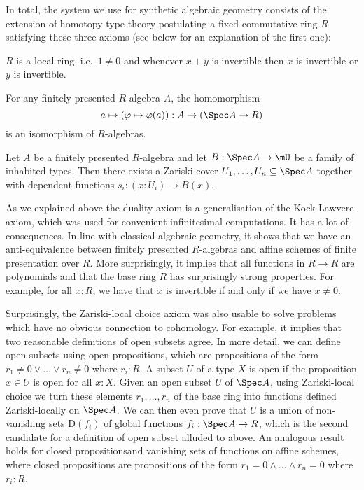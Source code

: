 In total, the system we use for synthetic algebraic geometry consists of the extension of homotopy type theory postulating a fixed commutative ring $R$ satisfying these three axioms (see below for an explanation of the first one):

\begin{center}
\begin{axiom}[Locality]%
  \label{loc-axiom}
  $R$ is a local ring, i.e.\ $1\neq 0$ and whenever $x+y$ is invertible then $x$ is invertible or $y$ is invertible.
\end{axiom}

\begin{axiom}[Duality]%
  \label{duality-axiom}
  For any finitely presented $R$-algebra $A$, the homomorphism
  \[ a \mapsto (\varphi\mapsto \varphi(a)) : A \to (\Spec A \to R)\]
  is an isomorphism of $R$-algebras.
\end{axiom}

\begin{axiom}%
  \label{Z-choice-axiom}
  Let $A$ be a finitely presented $R$-algebra
  and let $B : \Spec A \to \mU$ be a family of inhabited types.
  Then there exists a Zariski-cover $U_1,\dots,U_n\subseteq \Spec A$
  together with dependent functions $s_i : (x : U_i)\to B(x)$.
\end{axiom}
\end{center}

As we explained above the duality axiom is a generalisation of the Kock-Lawvere axiom, which was used for convenient infinitesimal computations. It has a lot of consequences. In line with classical algebraic geometry, it shows that we have an anti-equivalence between finitely presented $R$-algebras and affine schemes of finite presentation over $R$.
More surprisingly, it implies that all functions in $R\to R$ are polynomials and that the base ring $R$ has surprisingly strong properties.
For example, for all $x:R$, we have that $x$ is invertible if and only if we have $x\neq 0$.

Surprisingly, the Zariski-local choice axiom was also usable to solve problems which have no obvious connection to cohomology.
For example, it implies that two reasonable definitions of open subsets agree.
In more detail, we can define open subsets using open propositions, which are propositions of the form $r_1\neq 0 \vee\dots\vee r_n\neq 0$ where $r_i:R$.
A subset $U$ of a type $X$ is open if the proposition $x\in U$ is open for all $x:X$.
Given an open subset $U$ of $\Spec A$, using Zariski-local choice we turn these elements $r_1,\dots,r_n$ of the base ring into functions defined Zariski-locally on $\Spec A$.
We can then even prove that $U$ is a union of non-vanishing sets $\mathrm{D}(f_i)$ of global functions $f_i:\Spec A \to R$, which is the second candidate for a definition of open subset alluded to above.
An analogous result holds for closed propositionsand vanishing sets of functions on affine schemes, where closed propositions are propositions of the form $r_1=0\wedge\dots\wedge r_n=0$ where $r_i:R$.

